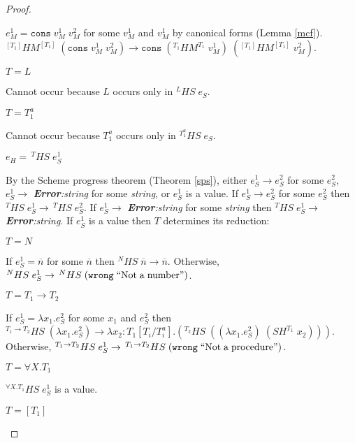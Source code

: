 \begin{theorem}
\begin{proof}
\begin{case}
\begin{case}
$e_{M}^{1}=\mathtt{cons}\;v_{M}^{1}\;v_{M}^{2}$ for some $v_{M}^{1}$ and $v_{M}^{1}$ by canonical forms (Lemma \ref{mcf}).  $^{[T_{1}]}HM^{[T_{1}]}\;(\mathtt{cons}\;v_{M}^{1}\;v_{M}^{2})\rightarrow\mathtt{cons}\;(^{T_{1}}HM^{T_{1}}\;v_{M}^{1})\;(^{[T_{1}]}HM^{[T_{1}]}\;v_{M}^{2})$.
\end{case}
\begin{case}
$T=L$

Cannot occur because $L$ occurs only in $^{L}HS\;e_{S}$.
\end{case}
\begin{case}
$T=T_{1}^{a}$

Cannot occur because $T_{1}^{a}$ occurs only in $^{T_{1}^{a}}HS\;e_{S}$.
\end{case}
\end{case}
\begin{case}
$e_{H}=\,^{T}HS\;e_{S}^{1}$

By the Scheme progress theorem (Theorem \ref{sps}), either $e_{S}^{1}\rightarrow e_{S}^{2}$ for some $e_{S}^{2}$, $e_{S}^{1}\rightarrow$ \emph{\textbf{Error}:\;string} for some \emph{string}, or $e_{S}^{1}$ is a value.  If $e_{S}^{1}\rightarrow e_{S}^{2}$ for some $e_{S}^{2}$ then $^{T}HS\;e_{S}^{1}\rightarrow\,^{T}HS\;e_{S}^{2}$.  If $e_{S}^{1}\rightarrow$ \emph{\textbf{Error}:\;string} for some \emph{string} then $^{T}HS\;e_{S}^{1}\rightarrow$ \emph{\textbf{Error}:\;string}.  If $e_{S}^{1}$ is a value then $T$ determines its reduction:
\begin{case}
$T=N$

If $e_{S}^{1}=\overline{n}$ for some $\overline{n}$ then $^{N}HS\;\overline{n}\rightarrow\overline{n}$.  Otherwise, $^{N}HS\;e_{S}^{1}\rightarrow\,^{N}HS\;(\mathtt{wrong}\;\mathrm{``Not\;a\;number"})$.
\end{case}
\begin{case}
$T=T_{1}\rightarrow T_{2}$

If $e_{S}^{1}=\lambda x_{1}.e_{S}^{2}$ for some $x_{1}$ and $e_{S}^{2}$ then $^{T_{1}\rightarrow T_{2}}HS\;(\lambda x_{1}.e_{S}^{2})\rightarrow\lambda x_{2}:T_{1}[T_{i}/T^{a}_{i}].(^{T_{2}}HS\;((\lambda x_{1}.e_{S}^{2})\;(SH^{T_{1}}\;x_{2})))$.  Otherwise, $^{T_{1}\rightarrow T_{2}}HS\;e_{S}^{1}\rightarrow\,^{T_{1}\rightarrow T_{2}}HS\;(\mathtt{wrong}\;\mathrm{``Not\;a\;procedure"})$.
\end{case}
\begin{case}
$T=\forall X.T_{1}$

$^{\forall X.T_{1}}HS\;e_{S}^{1}$ is a value.
\end{case}
\begin{case}
$T=[T_{1}]$


\end{case}
\end{case}
\end{proof}
\end{theorem}
